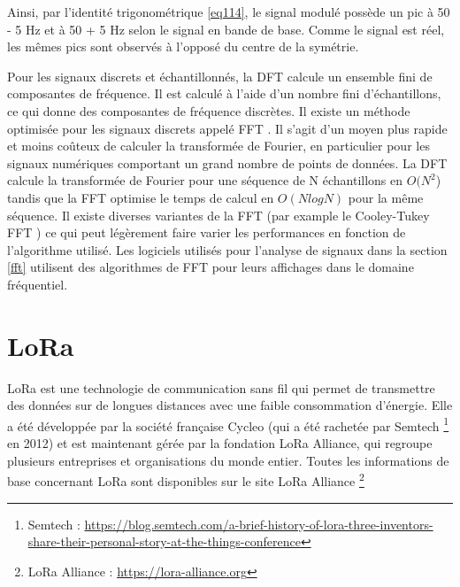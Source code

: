 Ainsi, par l'identité trigonométrique \ref{eq114}, le signal modulé possède un pic à 50 - 5 Hz et à 50 + 5 Hz selon le signal en bande de base. Comme le signal est réel, les mêmes pics sont observés à l'opposé du centre de la symétrie.

\vspace{0.1cm}

Pour les signaux discrets et échantillonnés, la \ac{DFT} calcule un ensemble fini de composantes de fréquence. Il est calculé à l’aide d’un nombre fini d’échantillons, ce qui donne des composantes de fréquence discrètes. Il existe un méthode optimisée pour les signaux discrets appelé \ac{FFT} \cite{fft}. Il s'agit d'un moyen plus rapide et moins coûteux de calculer la transformée de Fourier, en particulier pour les signaux numériques comportant un grand nombre de points de données. La DFT calcule la transformée de Fourier pour une séquence de N échantillons en $O(N^2$) tandis que la FFT optimise le temps de calcul en $O(N log N)$ pour la même séquence. Il existe diverses variantes de la FFT (par example le Cooley-Tukey FFT \cite{fft1}) ce qui peut légèrement faire varier les performances en fonction de l'algorithme utilisé. Les logiciels utilisés pour l'analyse de signaux dans la section \ref{fft} utilisent des algorithmes de \ac{FFT} pour leurs affichages dans le domaine fréquentiel.

\newpage

\section{LoRa}

\ac{LoRa} est une technologie de communication sans fil qui permet de transmettre des données sur de longues distances avec une faible consommation d'énergie. Elle a été développée par la société française Cycleo (qui a été rachetée par Semtech \footnote{Semtech : \href{https://blog.semtech.com/a-brief-history-of-lora-three-inventors-share-their-personal-story-at-the-things-conference}{https://blog.semtech.com/a-brief-history-of-lora-three-inventors-share-their-personal-story-at-the-things-conference}} en 2012) et est maintenant gérée par la fondation LoRa Alliance, qui regroupe plusieurs entreprises et organisations du monde entier. Toutes les informations de base concernant LoRa sont disponibles sur le site LoRa Alliance \footnote{LoRa Alliance : \href{https://lora-alliance.org}{https://lora-alliance.org}}

